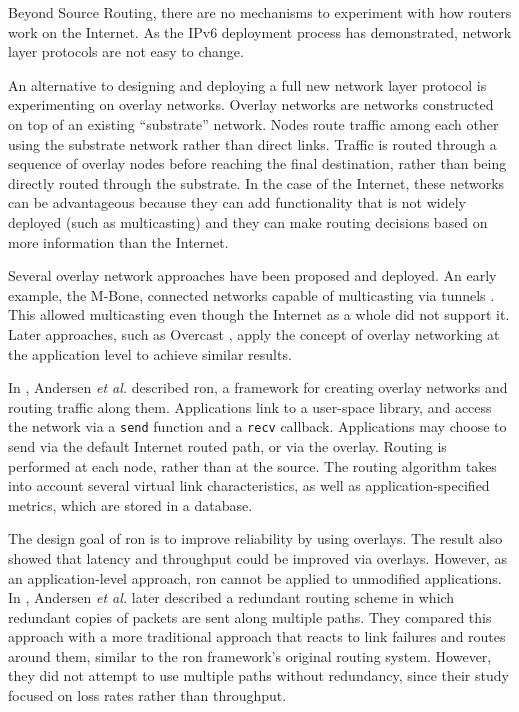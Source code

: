 \documentclass{cwru}
\begin{document}
Beyond Source Routing, there are no mechanisms to experiment with how routers
work on the Internet. As the IPv6 deployment process has demonstrated, network
layer protocols are not easy to change.

An alternative to designing and deploying a full new network layer protocol is
experimenting on overlay networks. Overlay networks are networks constructed on
top of an existing ``substrate'' network. Nodes route traffic among each other
using the substrate network rather than direct links. Traffic is routed through
a sequence of overlay nodes before reaching the final destination, rather than
being directly routed through the substrate. In the case of the Internet, these
networks can be advantageous because they can add functionality that is not
widely deployed (such as multicasting) and they can make routing decisions based
on more information than the Internet.

Several overlay network approaches have been proposed and deployed. An early
example, the M-Bone, connected networks capable of multicasting via tunnels
\cite{mbone}. This allowed multicasting even though the Internet as a whole did
not support it. Later approaches, such as Overcast \cite{jannotti2000overcast},
apply the concept of overlay networking at the application level to achieve
similar results.

In \cite{ron}, Andersen \textit{et al.} described \ac{ron}, a framework for
creating overlay networks and routing traffic along them. Applications link to a
user-space library, and access the network via a \texttt{send} function and a
\texttt{recv} callback. Applications may choose to send via the default Internet
routed path, or via the overlay. Routing is performed at each node, rather than
at the source. The routing algorithm takes into account several virtual link
characteristics, as well as application-specified metrics, which are stored in a
database.

The design goal of \ac{ron} is to improve reliability by using overlays. The
result also showed that latency and throughput could be improved via overlays.
However, as an application-level approach, \ac{ron} cannot be applied to
unmodified applications. In \cite{andersen2003best}, Andersen \textit{et al.}
later described a redundant routing scheme in which redundant copies of packets
are sent along multiple paths. They compared this approach with a more
traditional approach that reacts to link failures and routes around them,
similar to the \ac{ron} framework's original routing system. However, they did
not attempt to use multiple paths without redundancy, since their study focused
on loss rates rather than throughput.
\end{document}
